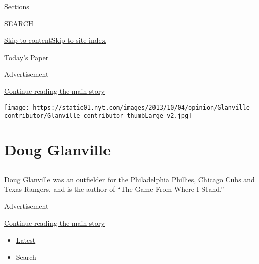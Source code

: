 Sections

SEARCH

\protect\hyperlink{site-content}{Skip to
content}\protect\hyperlink{site-index}{Skip to site index}

\href{https://myaccount.nytimes.com/auth/login?response_type=cookie\&client_id=vi}{}

\href{https://www.nytimes.com/section/todayspaper}{Today's Paper}

Advertisement

\protect\hyperlink{after-top}{Continue reading the main story}

\texttt{[image: https://static01.nyt.com/images/2013/10/04/opinion/Glanville-contributor/Glanville-contributor-thumbLarge-v2.jpg]}

\hypertarget{doug-glanville}{%
\section{Doug Glanville}\label{doug-glanville}}

\subsection{}

Doug Glanville was an outfielder for the Philadelphia Phillies, Chicago
Cubs and Texas Rangers, and is the author of ``The Game From Where I
Stand.''

Advertisement

\protect\hyperlink{after-mid1}{Continue reading the main story}

\begin{itemize}
\tightlist
\item
  \protect\hyperlink{stream-panel}{Latest}
\item
  Search
\end{itemize}

